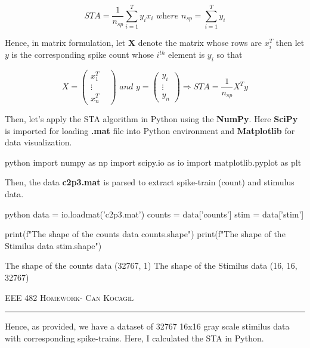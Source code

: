 \documentclass[12pt]{amsart}
\begin{document}
\begin{equation}
    STA = \frac{1}{n_{sp}}  \sum_{i=1}^T y_i x_i \textit{   where  } n_{sp}= \sum_{i=1}^T y_i
\end{equation}

Hence, in matrix formulation, let $\mathbf{X}$ denote the matrix whose rows are $x_i^T$ then let $y$ is the corresponding spike count whose $i^{th}$ element is  $y_i$ so that

\begin{equation}
X = 
\begin{pmatrix}
  x_1^T & \\ \vdots  \\ x_n^T
\end{pmatrix} \textit{  and  } 
y = 
\begin{pmatrix}
  y_i \\
  \vdots \\
  y_n
\end{pmatrix}
\Longrightarrow STA = \frac{1}{n_{sp}} X^T y
\end{equation}

Then, let's apply the STA algorithm in Python using the \textbf{NumPy}. Here \textbf{SciPy} is imported for loading \textbf{.mat} file into Python environment and \textbf{Matplotlib} for data visualization. 

\begin{mintedbox}{python}
import numpy as np 
import scipy.io as io
import matplotlib.pyplot as plt 
\end{mintedbox}

Then, the data \textbf{c2p3.mat} is parsed to extract spike-train (count) and stimulus data.

\begin{mintedbox}{python}
data = io.loadmat('c2p3.mat')
counts = data['counts']
stim = data['stim']

print(f"The shape of the counts data {counts.shape}")
print(f"The shape of the Stimilus data {stim.shape}")
\end{mintedbox}

The shape of the counts data (32767, 1) \newline
The shape of the Stimilus data (16, 16, 32767)

\newpage
{\scshape EEE 482} \hfill {\scshape \large  Homework-\relax} \hfill {\scshape Can Kocagil}
\smallskip
\hrule
\vspace{2mm}

Hence, as provided, we have a dataset of 32767 16x16 gray scale stimilus data with corresponding spike-trains. Here, I calculated the STA in Python.
\end{document}
